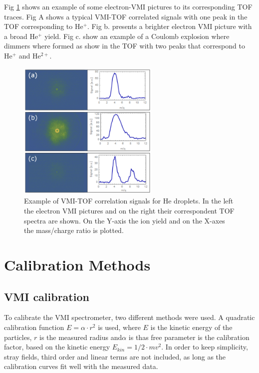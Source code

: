 Fig \ref{fig:correlatesimg} shows an example of some electron-VMI pictures to its corresponding TOF traces. Fig A shows a typical VMI-TOF correlated signals with one peak in the TOF corresponding to He$^{+}$. Fig b. presents a brighter electron VMI picture with a broad He$^+$ yield. Fig c. show an example of a Coulomb explosion where dimmers where formed as show in the TOF with two peaks that correspond to He$^{+}$ and He$^{2+}$.

\begin{figure}[h!]
 \centering
\includegraphics[width=0.6\textwidth]{../Images/results/mir_correlated/mir_correlated.png} 
  \caption[Correlation signals example]{Example of VMI-TOF correlation signals for He droplets. In the left the electron VMI pictures and on the right their correspondent TOF spectra are shown. On the Y-axis the ion yield and on the X-axes the mass/charge ratio is plotted. }
  \label{fig:correlatesimg}
 \end{figure}
  

\section{Calibration Methods}

\subsection{VMI calibration}

To calibrate the VMI spectrometer, two different methods were used. A quadratic calibration function $E=\alpha\cdot r^2$ is used, where $E$ is the kinetic energy of the particles, $r$ is the measured radius and$\alpha$ is thas free parameter is the calibration factor, based on the kinetic energy $E_{kin}=1/2 \cdot m v^2$. In order to keep simplicity, stray fields, third order and linear terms are not included, as long as the calibration curves fit well with the measured data.


